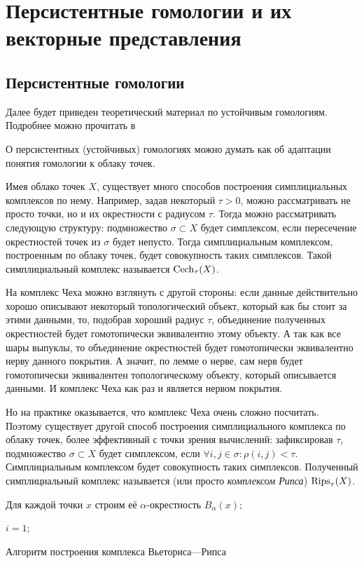 \section{\centering Персистентные гомологии и их векторные представления}
\subsection{\centering Персистентные гомологии}
Далее будет приведен теоретический материал по устойчивым гомологиям. Подробнее можно прочитать в \cite{Edelsbrunner, base, alsobase}

О персистентных (устойчивых) гомологиях можно думать как об адаптации понятия гомологии к облаку точек. 

Имея облако точек $X$, существует много способов построения симплициальных комплексов по нему. Например, задав некоторый $\tau > 0$, можно рассматривать не просто точки, но и их окрестности с радиусом $\tau$. Тогда можно рассматривать следующую структуру: подмножество $\sigma \subset X$ будет симплексом, если пересечение окрестностей точек из $\sigma$ будет непусто. Тогда симплициальным комплексом, построенным по облаку точек, будет совокупность таких симплексов. Такой симплициальный комплекс называется  $\mathrm{Cech}_\tau(X)$. 

На комплекс Чеха можно взглянуть с другой стороны: если данные действительно хорошо описывают некоторый топологический объект, который как бы стоит за этими данными, то, подобрав хороший радиус $\tau$, объединение полученных окрестностей будет гомотопически эквивалентно этому объекту. А так как все шары выпуклы, то объединение окрестностей будет гомотопически эквивалентно нерву данного покрытия. А значит, по лемме о нерве, сам нерв будет гомотопически эквивалентен топологическому объекту, который описывается данными. И комплекс Чеха как раз и является нервом покрытия. 

Но на практике оказывается, что комплекс Чеха очень сложно посчитать. Поэтому существует другой способ построения симплициального комплекса по облаку точек, более эффективный с точки зрения вычислений: зафиксировав $\tau$, подмножество $\sigma \subset X$ будет симплексом, если $\forall i,j \in \sigma: \rho(i,j) < \tau$. Симплициальным комплексом будет совокупность таких симплексов. Полученный симплициальный комплекс называется  (или просто {\it комплексом Рипса}) $\mathrm{Rips}_\tau(X)$.

\medskip
\begin{algorithm}[H]
	\small
	\SetAlgoLined
	Для каждой точки $x$ строим её $\alpha$-окрестность $B_\alpha(x)$;
	
	$i = 1$;
	
	\caption{Алгоритм построения комплекса Вьеториса—Рипса}
\end{algorithm}
\medskip

